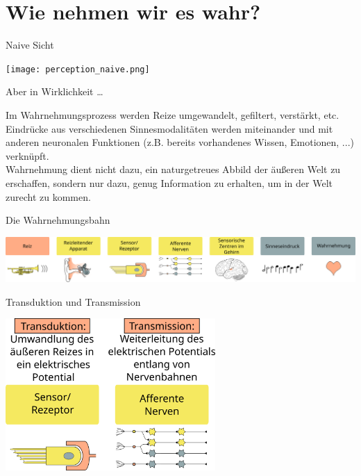\documentclass[aspectratio=169]{beamer}
\begin{document}
\section{Wie nehmen wir es wahr?}


\begin{frame}{Naive Sicht}

\begin{center}
    \texttt{[image: perception\_naive.png]}
\end{center}
    
\end{frame}


\begin{frame}{Aber in Wirklichkeit \dots}

Im Wahrnehmungsprozess werden Reize umgewandelt, gefiltert, verstärkt, etc.  Eindrücke aus verschiedenen Sinnesmodalitäten werden miteinander und mit anderen neuronalen Funktionen (z.B. bereits vorhandenes Wissen, Emotionen, ...) verknüpft.  \\[1cm]

Wahrnehmung dient nicht dazu, ein naturgetreues Abbild der äußeren Welt zu erschaffen, sondern nur dazu, genug Information zu erhalten, um in der Welt zurecht zu kommen. 

\end{frame}


\begin{frame}{Die Wahrnehmungsbahn}

\begin{center}
    \includegraphics[width=\textwidth]{wahrnehmungsprozess.png}
\end{center}
    
\end{frame}
 
 


\begin{frame}{Transduktion und Transmission}

\begin{center}
    \includegraphics[width=0.6\textwidth]{wahrnehmungsprozess_transduktion_transmission.png}
\end{center}
    
\end{frame}
\end{document}
